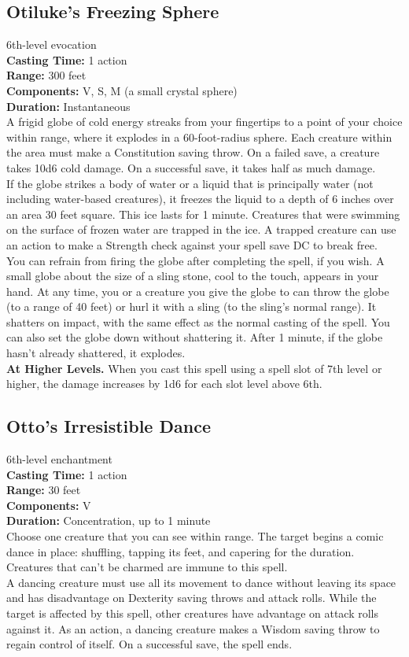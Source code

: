 \documentclass[11pt, A4paper, english]{article}
\begin{document}
		\subsection{Otiluke’s Freezing Sphere}
6th-level evocation \\
\textbf{Casting Time:} 1 action \\
\textbf{Range:} 300 feet \\
\textbf{Components:} V, S, M (a small crystal sphere) \\
\textbf{Duration:} Instantaneous \\
A frigid globe of cold energy streaks from your fingertips to a point of your choice within range, where it explodes in a 60-foot-radius sphere. Each creature within the area must make a Constitution saving throw. On a failed save, a creature takes 10d6 cold damage. On a successful save, it takes half as much damage. \\
If the globe strikes a body of water or a liquid that is principally water (not including water-based creatures), it freezes the liquid to a depth of 6 inches over an area 30 feet square. This ice lasts for 1 minute. Creatures that were swimming on the surface of frozen water are trapped in the ice. A trapped creature can use an action to make a Strength check against your spell save DC to break free. \\
You can refrain from firing the globe after completing the spell, if you wish. A small globe about the size of a sling stone, cool to the touch, appears in your hand. At any time, you or a creature you give the globe to can throw the globe (to a range of 40 feet) or hurl it with a sling (to the sling’s normal range). It shatters on impact, with the same effect as the normal casting of the spell. You can also set the globe down without shattering it. After 1 minute, if the globe hasn’t already shattered, it explodes. \\
\textbf{At Higher Levels.} When you cast this spell using a spell slot of 7th level or higher, the damage increases by 1d6 for each slot level above 6th.

		\subsection{Otto’s Irresistible Dance}
6th-level enchantment \\
\textbf{Casting Time:} 1 action \\
\textbf{Range:} 30 feet \\
\textbf{Components:} V \\
\textbf{Duration:} Concentration, up to 1 minute \\
Choose one creature that you can see within range. The target begins a comic dance in place: shuffling, tapping its feet, and capering for the duration. Creatures that can’t be charmed are immune to this spell. \\
A dancing creature must use all its movement to dance without leaving its space and has disadvantage on Dexterity saving throws and attack rolls. While the target is affected by this spell, other creatures have advantage on attack rolls against it. As an action, a dancing creature makes a Wisdom  saving throw to regain control of itself. On a successful save, the spell ends.
\end{document}
